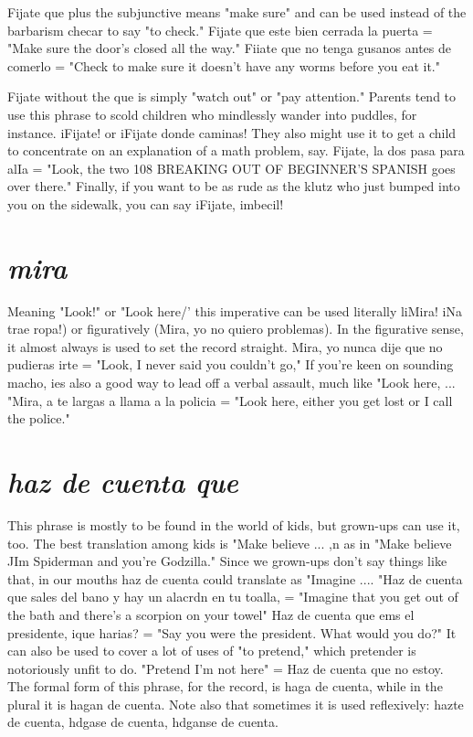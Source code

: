 Fijate que plus the subjunctive means "make sure" and can be
used instead of the barbarism checar to say "to check." Fijate que este
bien cerrada la puerta = "Make sure the door's closed all the way."
Fiiate que no tenga gusanos antes de comerlo = "Check to make sure
it doesn't have any worms before you eat it."

Fijate without the que is simply "watch out" or "pay attention." Parents tend to use this phrase to scold children who mindlessly
wander into puddles, for instance. iFijate! or iFijate donde caminas!
They also might use it to get a child to concentrate on an explanation
of a math problem, say. Fijate, la dos pasa para alIa = "Look, the two
108 BREAKING OUT OF BEGINNER'S SPANISH
goes over there." Finally, if you want to be as rude as the klutz who
just bumped into you on the sidewalk, you can say iFijate, imbecil!

\section{\emph{mira}}

Meaning "Look!" or "Look here/' this imperative can be used
literally liMira! iNa trae ropa!) or figuratively (Mira, yo no quiero
problemas). In the figurative sense, it almost always is used to set the
record straight. Mira, yo nunca dije que no pudieras irte = "Look,
I never said you couldn't go," If you're keen on sounding macho, ies
also a good way to lead off a verbal assault, much like "Look here, ...
"Mira, a te largas a llama a la policia = "Look here, either you get
lost or I call the police."

\section{\emph{haz de cuenta que}}

This phrase is mostly to be found in the world of kids, but
grown-ups can use it, too. The best translation among kids is "Make
believe ... ,n as in "Make believe JIm Spiderman and you're Godzilla."
Since we grown-ups don't say things like that, in our mouths haz de
cuenta could translate as "Imagine .... "Haz de cuenta que sales del
bano y hay un alacrdn en tu toalla, = "Imagine that you get out of the
bath and there's a scorpion on your towel" Haz de cuenta que ems el
presidente, ique harias? = "Say you were the president. What would
you do?" It can also be used to cover a lot of uses of "to pretend,"
which pretender is notoriously unfit to do. "Pretend I'm not here" =
Haz de cuenta que no estoy. The formal form of this phrase, for the
record, is haga de cuenta, while in the plural it is hagan de cuenta.
Note also that sometimes it is used reflexively: hazte de cuenta, hdgase de cuenta, hdganse de cuenta.

